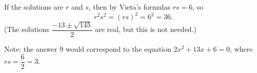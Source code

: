 If the solutions are $r$ and $s$, then by Vieta's formulas $rs=6$, so
\[
r^2s^2=(rs)^2=6^2=\boxed{36}.
\]
(The solutions $\dfrac{-13\pm\sqrt{145}}{2}$ are real, but this is not needed.)

Note: the answer $9$ would correspond to the equation $2x^2+13x+6=0$, where $rs=\dfrac{6}{2}=3$.
